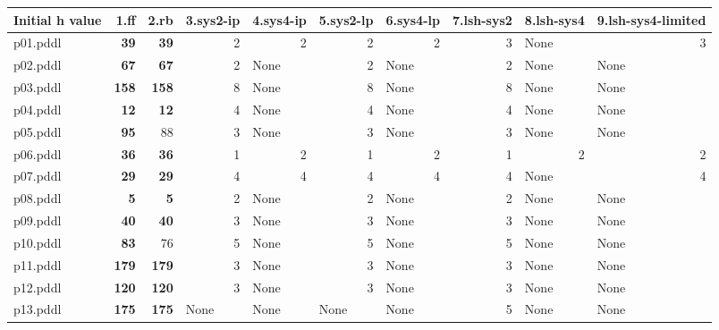 \documentclass{article}
\begin{document}
\begin{tabular}{@{}lrrrrrrrrr@{}}
Initial h value & 1.ff & 2.rb & 3.sys2-ip & 4.sys4-ip & 5.sys2-lp & 6.sys4-lp & 7.lsh-sys2 & 8.lsh-sys4 & 9.lsh-sys4-limited \\
\midrule
p01.pddl & \textbf{39} & \textbf{39} & 2 & 2 & 2 & 2 & 3 & \multicolumn{1}{|l|}{None} & 3 \\
p02.pddl & \textbf{67} & \textbf{67} & 2 & \multicolumn{1}{|l|}{None} & 2 & \multicolumn{1}{|l|}{None} & 2 & \multicolumn{1}{|l|}{None} & \multicolumn{1}{|l|}{None} \\
p03.pddl & \textbf{158} & \textbf{158} & 8 & \multicolumn{1}{|l|}{None} & 8 & \multicolumn{1}{|l|}{None} & 8 & \multicolumn{1}{|l|}{None} & \multicolumn{1}{|l|}{None} \\
p04.pddl & \textbf{12} & \textbf{12} & 4 & \multicolumn{1}{|l|}{None} & 4 & \multicolumn{1}{|l|}{None} & 4 & \multicolumn{1}{|l|}{None} & \multicolumn{1}{|l|}{None} \\
p05.pddl & \textbf{95} & 88 & 3 & \multicolumn{1}{|l|}{None} & 3 & \multicolumn{1}{|l|}{None} & 3 & \multicolumn{1}{|l|}{None} & \multicolumn{1}{|l|}{None} \\
p06.pddl & \textbf{36} & \textbf{36} & 1 & 2 & 1 & 2 & 1 & 2 & 2 \\
p07.pddl & \textbf{29} & \textbf{29} & 4 & 4 & 4 & 4 & 4 & \multicolumn{1}{|l|}{None} & 4 \\
p08.pddl & \textbf{5} & \textbf{5} & 2 & \multicolumn{1}{|l|}{None} & 2 & \multicolumn{1}{|l|}{None} & 2 & \multicolumn{1}{|l|}{None} & \multicolumn{1}{|l|}{None} \\
p09.pddl & \textbf{40} & \textbf{40} & 3 & \multicolumn{1}{|l|}{None} & 3 & \multicolumn{1}{|l|}{None} & 3 & \multicolumn{1}{|l|}{None} & \multicolumn{1}{|l|}{None} \\
p10.pddl & \textbf{83} & 76 & 5 & \multicolumn{1}{|l|}{None} & 5 & \multicolumn{1}{|l|}{None} & 5 & \multicolumn{1}{|l|}{None} & \multicolumn{1}{|l|}{None} \\
p11.pddl & \textbf{179} & \textbf{179} & 3 & \multicolumn{1}{|l|}{None} & 3 & \multicolumn{1}{|l|}{None} & 3 & \multicolumn{1}{|l|}{None} & \multicolumn{1}{|l|}{None} \\
p12.pddl & \textbf{120} & \textbf{120} & 3 & \multicolumn{1}{|l|}{None} & 3 & \multicolumn{1}{|l|}{None} & 3 & \multicolumn{1}{|l|}{None} & \multicolumn{1}{|l|}{None} \\
p13.pddl & \textbf{175} & \textbf{175} & \multicolumn{1}{|l|}{None} & \multicolumn{1}{|l|}{None} & \multicolumn{1}{|l|}{None} & \multicolumn{1}{|l|}{None} & 5 & \multicolumn{1}{|l|}{None} & \multicolumn{1}{|l|}{None} \\

\end{tabular}
\end{document}
